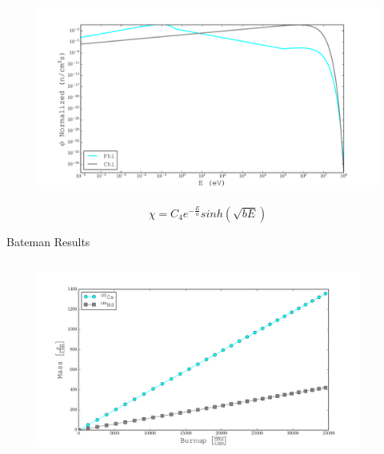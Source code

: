 \documentclass{beamer}
\begin{document}
\begin{frame}
      \begin{figure}[H]
        \vspace*{-1cm}
        \begin{center}
          \includegraphics[scale = 0.4]{../../Calculations/Project/Weighting/Figures/Phi_N_Chi.pdf}
          \vspace{-0.5cm}
        \end{center}
      \end{figure}
      \vspace{2cm}
      \begin{equation*}
        \chi=C_4e^{-\frac{E}{a}}sinh\left(\sqrt{bE}\right)
      \end{equation*}
\end{frame}


\begin{frame}{Bateman Results}
  \begin{columns}
    \begin{column}{0.5\textwidth}
      \begin{figure}[H]
        \vspace*{-1cm}
        \begin{center}
          \includegraphics[scale = 0.4]{../../Calculations/Bateman/PlotBU/Plots/BurnCsComp_grams.pdf}
          \vspace{-0.5cm}
        \end{center}
      \end{figure}
    \end{column}
    \begin{column}{0.5\textwidth}
    \end{column}
  \end{columns}  
\end{frame}
\end{document}
